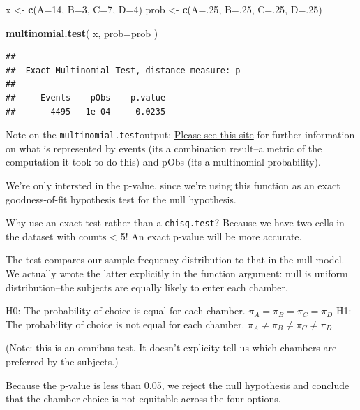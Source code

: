 \documentclass[]{book}
\newenvironment{Shaded}{\begin{snugshade}}{\end{snugshade}}
\newcommand{\DataTypeTok}[1]{\textcolor[rgb]{0.13,0.29,0.53}{#1}}
\newcommand{\DecValTok}[1]{\textcolor[rgb]{0.00,0.00,0.81}{#1}}
\newcommand{\KeywordTok}[1]{\textcolor[rgb]{0.13,0.29,0.53}{\textbf{#1}}}
\newcommand{\NormalTok}[1]{#1}
\newcommand{\StringTok}[1]{\textcolor[rgb]{0.31,0.60,0.02}{#1}}
\begin{document}
\begin{Shaded}
\begin{Highlighting}[]
\NormalTok{x <-}\StringTok{ }\KeywordTok{c}\NormalTok{(}\DataTypeTok{A=}\DecValTok{14}\NormalTok{, }\DataTypeTok{B=}\DecValTok{3}\NormalTok{, }\DataTypeTok{C=}\DecValTok{7}\NormalTok{, }\DataTypeTok{D=}\DecValTok{4}\NormalTok{)}
\NormalTok{prob <-}\StringTok{ }\KeywordTok{c}\NormalTok{(}\DataTypeTok{A=}\NormalTok{.}\DecValTok{25}\NormalTok{, }\DataTypeTok{B=}\NormalTok{.}\DecValTok{25}\NormalTok{, }\DataTypeTok{C=}\NormalTok{.}\DecValTok{25}\NormalTok{, }\DataTypeTok{D=}\NormalTok{.}\DecValTok{25}\NormalTok{)}

\KeywordTok{multinomial.test}\NormalTok{(}
\NormalTok{  x, }
  \DataTypeTok{prob=}\NormalTok{prob}
\NormalTok{  )}
\end{Highlighting}
\end{Shaded}

\begin{verbatim}
## 
##  Exact Multinomial Test, distance measure: p
## 
##     Events    pObs    p.value
##       4495   1e-04     0.0235
\end{verbatim}

Note on the \texttt{multinomial.test}output: \href{http://rinterested.github.io/statistics/multinomial_exact.html}{Please see this site} for further information on what is represented by events (its a combination result--a metric of the computation it took to do this) and pObs (its a multinomial probability).

We're only intersted in the p-value, since we're using this function as an exact goodness-of-fit hypothesis test for the null hypothesis.

Why use an exact test rather than a \texttt{chisq.test}? Because we have two cells in the dataset with counts \textless{} 5! An exact p-value will be more accurate.

The test compares our sample frequency distribution to that in the null model. We actually wrote the latter explicitly in the function argument: null is uniform distribution--the subjects are equally likely to enter each chamber.

H0: The probability of choice is equal for each chamber.
\(\pi_A=\pi_B=\pi_C=\pi_D\)
H1: The probability of choice is not equal for each chamber.
\(\pi_A\ne\pi_B\ne\pi_C\ne\pi_D\)

(Note: this is an omnibus test. It doesn't explicity tell us which chambers are preferred by the subjects.)

Because the p-value is less than 0.05, we reject the null hypothesis and conclude that the chamber choice is not equitable across the four options.
\end{document}
